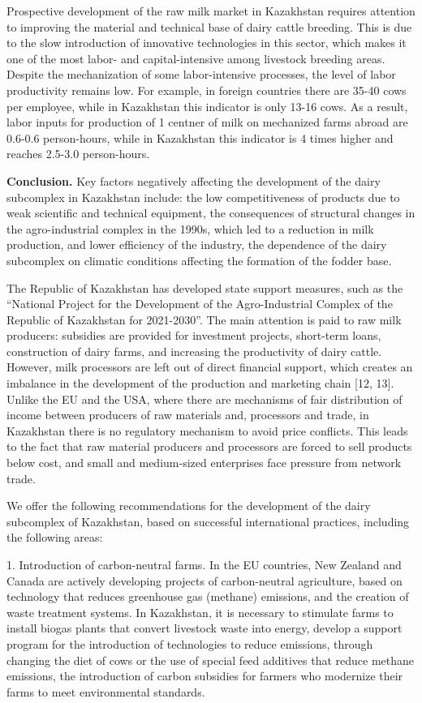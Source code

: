 Prospective development of the raw milk market in Kazakhstan requires
attention to improving the material and technical base of dairy cattle
breeding. This is due to the slow introduction of innovative
technologies in this sector, which makes it one of the most labor- and
capital-intensive among livestock breeding areas. Despite the
mechanization of some labor-intensive processes, the level of labor
productivity remains low. For example, in foreign countries there are
35-40 cows per employee, while in Kazakhstan this indicator is only
13-16 cows. As a result, labor inputs for production of 1 centner of
milk on mechanized farms abroad are 0.6-0.6 person-hours, while in
Kazakhstan this indicator is 4 times higher and reaches 2.5-3.0
person-hours.

{\bfseries Conclusion.} Key factors negatively affecting the development of
the dairy subcomplex in Kazakhstan include: the low competitiveness of
products due to weak scientific and technical equipment, the
consequences of structural changes in the agro-industrial complex in the
1990s, which led to a reduction in milk production, and lower efficiency
of the industry, the dependence of the dairy subcomplex on climatic
conditions affecting the formation of the fodder base.

The Republic of Kazakhstan has developed state support measures, such as
the ``National Project for the Development of the Agro-Industrial
Complex of the Republic of Kazakhstan for 2021-2030''. The main
attention is paid to raw milk producers: subsidies are provided for
investment projects, short-term loans, construction of dairy farms, and
increasing the productivity of dairy cattle. However, milk processors
are left out of direct financial support, which creates an imbalance in
the development of the production and marketing chain {[}12, 13{]}.
Unlike the EU and the USA, where there are mechanisms of fair
distribution of income between producers of raw materials and,
processors and trade, in Kazakhstan there is no regulatory mechanism to
avoid price conflicts. This leads to the fact that raw material
producers and processors are forced to sell products below cost, and
small and medium-sized enterprises face pressure from network trade.

We offer the following recommendations for the development of the dairy
subcomplex of Kazakhstan, based on successful international practices,
including the following areas:


1. Introduction of carbon-neutral farms. In the EU countries, New Zealand
and Canada are actively developing projects of carbon-neutral
agriculture, based on technology that reduces greenhouse gas (methane)
emissions, and the creation of waste treatment systems. In Kazakhstan,
it is necessary to stimulate farms to install biogas plants that
convert livestock waste into energy, develop a support program for the
introduction of technologies to reduce emissions, through changing the
diet of cows or the use of special feed additives that reduce methane
emissions, the introduction of carbon subsidies for farmers who
modernize their farms to meet environmental standards.

